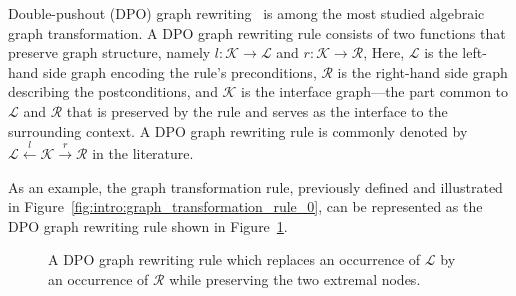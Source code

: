  Double-pushout (DPO) graph rewriting~\cite{corradini1997algebraic,habel2001double} is among the most studied algebraic graph transformation. A DPO graph rewriting rule consists of two functions that preserve graph structure, namely $l:\mathcal{K} \to \mathcal{L}$ and $r:\mathcal{K} \to \mathcal{R}$,
 Here, \(\mathcal{L}\) is the left-hand side graph encoding the rule's preconditions, \(\mathcal{R}\) is the right-hand side graph describing the postconditions, and \(\mathcal{K}\) is the interface graph—the part common to \(\mathcal{L}\) and \(\mathcal{R}\) that is preserved by the rule and serves as the interface to the surrounding context. A DPO graph rewriting rule is commonly denoted by \(\mathcal{L} \xleftarrow{l} \mathcal{K} \xrightarrow{r} \mathcal{R}\) in the literature.
 
 As an example, the graph transformation rule, previously defined and illustrated in Figure~\ref{fig:intro:graph_transformation_rule_0}, can be represented as the DPO graph rewriting rule shown in Figure~\ref{fig:intro:graph_transformation_rule_0_dpo}.

 \begin{figure}[H]
    \centering
    \caption{A DPO graph rewriting rule which replaces an occurrence of \(\mathcal{L}\) by an occurrence of \(\mathcal{R}\) while preserving the two extremal nodes.}
    \label{fig:intro:graph_transformation_rule_0_dpo}
    \end{figure} 

